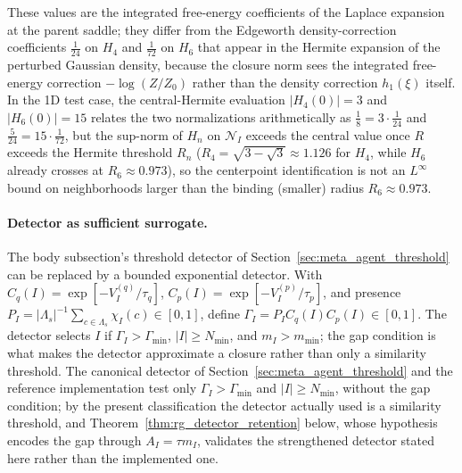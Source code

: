 \documentclass[11pt]{article}
\begin{document}
These values are the integrated free-energy coefficients of the Laplace expansion at the parent saddle; they differ from the Edgeworth density-correction coefficients $\tfrac{1}{24}$ on $H_4$ and $\tfrac{1}{72}$ on $H_6$ that appear in the Hermite expansion of the perturbed Gaussian density, because the closure norm sees the integrated free-energy correction $-\log(Z/Z_0)$ rather than the density correction $h_1(\xi)$ itself. In the 1D test case, the central-Hermite evaluation $|H_4(0)| = 3$ and $|H_6(0)| = 15$ relates the two normalizations arithmetically as $\tfrac{1}{8} = 3 \cdot \tfrac{1}{24}$ and $\tfrac{5}{24} = 15 \cdot \tfrac{1}{72}$, but the sup-norm of $H_n$ on $\mathcal{N}_I$ exceeds the central value once $R$ exceeds the Hermite threshold $R_n$ ($R_4 = \sqrt{3-\sqrt{3}} \approx 1.126$ for $H_4$, while $H_6$ already crosses at $R_6 \approx 0.973$), so the centerpoint identification is not an $L^\infty$ bound on neighborhoods larger than the binding (smaller) radius $R_6 \approx 0.973$.

\paragraph{Detector as sufficient surrogate.}
The body subsection's threshold detector of Section~\ref{sec:meta_agent_threshold} can be replaced by a bounded exponential detector. With $C_q(I) = \exp[-V_I^{(q)}/\tau_q]$, $C_p(I) = \exp[-V_I^{(p)}/\tau_p]$, and presence $P_I = |\Lambda_s|^{-1}\sum_{c \in \Lambda_s}\chi_I(c) \in [0, 1]$, define $\Gamma_I = P_I C_q(I) C_p(I) \in [0, 1]$. The detector selects $I$ if $\Gamma_I > \Gamma_{\min}$, $|I| \ge N_{\min}$, and $m_I > m_{\min}$; the gap condition is what makes the detector approximate a closure rather than only a similarity threshold. The canonical detector of Section~\ref{sec:meta_agent_threshold} and the reference implementation test only $\Gamma_I > \Gamma_{\min}$ and $|I| \ge N_{\min}$, without the gap condition; by the present classification the detector actually used is a similarity threshold, and Theorem~\ref{thm:rg_detector_retention} below, whose hypothesis encodes the gap through $A_I = \tau m_I$, validates the strengthened detector stated here rather than the implemented one.
\end{document}
